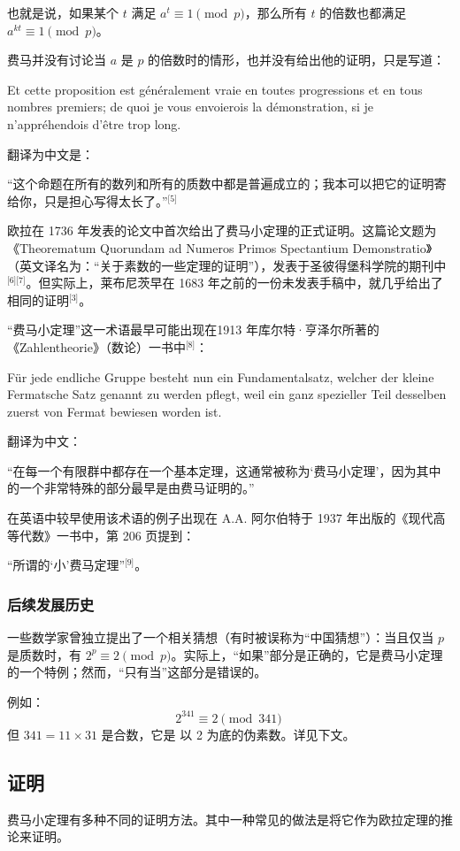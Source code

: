 也就是说，如果某个 $t$ 满足 $a^t \equiv 1 \pmod{p}$，那么所有 $t$ 的倍数也都满足 $a^{kt} \equiv 1 \pmod{p}$。

费马并没有讨论当 $a$ 是 $p$ 的倍数时的情形，也并没有给出他的证明，只是写道：

Et cette proposition est généralement vraie en toutes progressions et en tous nombres premiers; de quoi je vous envoierois la démonstration, si je n'appréhendois d'être trop long.

翻译为中文是：

“这个命题在所有的数列和所有的质数中都是普遍成立的；我本可以把它的证明寄给你，只是担心写得太长了。”\(^\text{[5]}\)

欧拉在 1736 年发表的论文中首次给出了费马小定理的正式证明。这篇论文题为 《Theorematum Quorundam ad Numeros Primos Spectantium Demonstratio》（英文译名为：“关于素数的一些定理的证明”），发表于圣彼得堡科学院的期刊中\(^\text{[6][7]}\)。但实际上，莱布尼茨早在 1683 年之前的一份未发表手稿中，就几乎给出了相同的证明\(^\text{[3]}\)。

“费马小定理”这一术语最早可能出现在1913 年库尔特·亨泽尔所著的《Zahlentheorie》（数论）一书中\(^\text{[8]}\)：

Für jede endliche Gruppe besteht nun ein Fundamentalsatz, welcher der kleine Fermatsche Satz genannt zu werden pflegt, weil ein ganz spezieller Teil desselben zuerst von Fermat bewiesen worden ist.

翻译为中文：

“在每一个有限群中都存在一个基本定理，这通常被称为‘费马小定理’，因为其中的一个非常特殊的部分最早是由费马证明的。”

在英语中较早使用该术语的例子出现在 A.A. 阿尔伯特于 1937 年出版的《现代高等代数》一书中，第 206 页提到：

“所谓的‘小’费马定理”\(^\text{[9]}\)。
\subsubsection{后续发展历史}
一些数学家曾独立提出了一个相关猜想（有时被误称为“中国猜想”）：当且仅当 $p$ 是质数时，有 $2^p \equiv 2 \pmod{p}$。实际上，“如果”部分是正确的，它是费马小定理的一个特例；然而，“只有当”这部分是错误的。

例如：
$$
2^{341} \equiv 2 \pmod{341}~
$$
但 $341 = 11 \times 31$ 是合数，它是 以 2 为底的伪素数。详见下文。
\subsection{证明}
费马小定理有多种不同的证明方法。其中一种常见的做法是将它作为欧拉定理的推论来证明。
